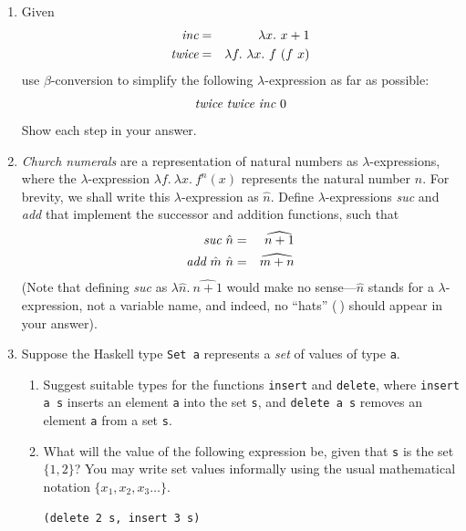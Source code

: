 \documentclass{article}
\begin{document}
\begin{enumerate}
\item

Given
\begin{eqnarray*}
\mbox{\it inc}&=&\lambda x.~x+1\\
\mbox{\it twice}&=&\lambda f.~\lambda x.~f~(f~x)
\end{eqnarray*}
use $\beta$-conversion to simplify the following $\lambda$-expression as far as possible:
\[
\mbox{\it twice}~\mbox{\it twice}~\mbox{\it inc}~0
\]
Show each step in your answer.


\item
{\em Church numerals} are a representation of natural numbers as
$\lambda$-expressions, where the $\lambda$-expression $\lambda
f.~\lambda x.~f^n(x)$ represents the natural number $n$. For brevity,
we shall write this $\lambda$-expression as $\hat{n}$. Define
$\lambda$-expressions {\it suc} and {\it add} that implement the
successor and addition functions, such that
\begin{eqnarray*}
\mbox{\it suc}~\hat{n}&=&\widehat{n+1}\\
\mbox{\it add}~\hat{m}~\hat{n}&=&\widehat{m+n}
\end{eqnarray*}
(Note that defining {\em suc} as $\lambda \hat{n}.~\widehat{n+1}$
would make no sense---$\hat{n}$ stands for a $\lambda$-expression, not
a variable name, and indeed, no ``hats'' ($\hat{~}$) should appear in
your answer).


\item
Suppose the Haskell type \verb!Set a! represents a {\em set} of values
of type \verb!a!.
\begin{enumerate}
\item
Suggest suitable types for the functions \verb!insert! and
\verb!delete!, where \verb!insert a s! inserts an element \verb!a!
into the set \verb!s!, and \verb!delete a s! removes an element
\verb!a! from a set \verb!s!.

\item
What will the value of the following expression be, given that
\verb!s! is the set $\{1,2\}$? You may write set values informally
using the usual mathematical notation $\{x_1, x_2, x_3\dots\}$.
\begin{verbatim}
(delete 2 s, insert 3 s)
\end{verbatim}

\end{enumerate}


\end{enumerate}
\end{document}
